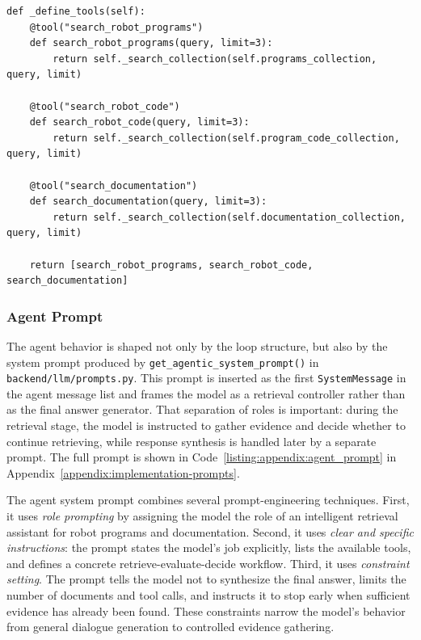 \begin{listing}[H]
	\begin{verbatim}
def _define_tools(self):
	@tool("search_robot_programs")
	def search_robot_programs(query, limit=3):
		return self._search_collection(self.programs_collection, query, limit)

	@tool("search_robot_code")
	def search_robot_code(query, limit=3):
		return self._search_collection(self.program_code_collection, query, limit)

	@tool("search_documentation")
	def search_documentation(query, limit=3):
		return self._search_collection(self.documentation_collection, query, limit)

	return [search_robot_programs, search_robot_code, search_documentation]
	\end{verbatim}
	\caption{Tool definitions.}
	\label{listing:implementation:tool_registration}
\end{listing}

\subsubsection{Agent Prompt}
The agent behavior is shaped not only by the loop structure, but also by the system prompt produced by \texttt{get\_agentic\_system\_prompt()} in \texttt{backend/llm/prompts.py}. This prompt is inserted as the first \texttt{System\-Message} in the agent message list and frames the model as a retrieval controller rather than as the final answer generator. That separation of roles is important: during the retrieval stage, the model is instructed to gather evidence and decide whether to continue retrieving, while response synthesis is handled later by a separate prompt. The full prompt is shown in Code~\ref{listing:appendix:agent_prompt} in Appendix~\ref{appendix:implementation-prompts}.

The agent system prompt combines several prompt-engineering techniques. First, it uses \textit{role prompting} by assigning the model the role of an intelligent retrieval assistant for robot programs and documentation. Second, it uses \textit{clear and specific instructions}: the prompt states the model's job explicitly, lists the available tools, and defines a concrete retrieve-evaluate-decide workflow. Third, it uses \textit{constraint setting}. The prompt tells the model not to synthesize the final answer, limits the number of documents and tool calls, and instructs it to stop early when sufficient evidence has already been found. These constraints narrow the model's behavior from general dialogue generation to controlled evidence gathering.

